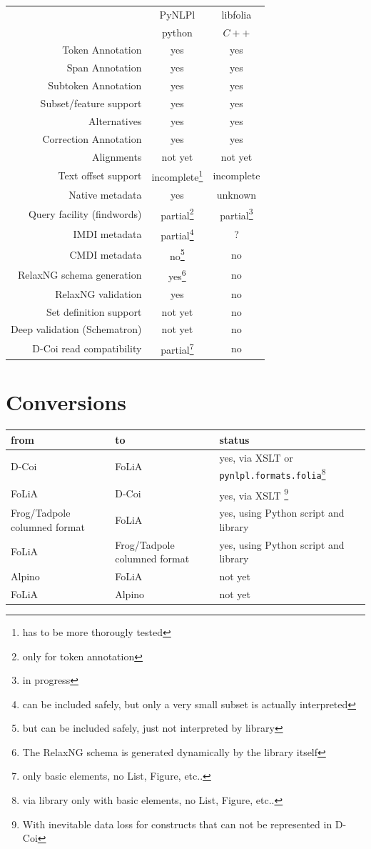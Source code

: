 \documentclass[a4paper,12pt]{report}
\begin{document}
\begin{tabular}{|r|c|c|}
\hline
                        & PyNLPl & libfolia  \\
                        & python & $C++$ \\
\hline
Token Annotation        & yes & yes \\
Span Annotation         & yes & yes \\
Subtoken Annotation     & yes & yes \\
Subset/feature support  & yes & yes \\
Alternatives            & yes & yes \\
Correction Annotation   & yes & yes \\
Alignments              & not yet & not yet \\
Text offset support     & incomplete\footnote{has to be more thorougly tested} & incomplete \\
Native metadata         & yes & unknown \\
\hline
Query facility (findwords) & partial\footnote{only for token annotation} & partial\footnote{in progress} \\
\hline
IMDI metadata           & partial\footnote{can be included safely, but only a very small subset is actually interpreted} & ? \\
CMDI metadata           & no\footnote{but can be included safely, just not interpreted by library} & no \\
RelaxNG schema generation & yes\footnote{The RelaxNG schema is generated dynamically by the library itself} & no \\
RelaxNG validation      & yes & no \\
Set definition support  & not yet & no \\
Deep validation (Schematron)  & not yet & no \\
D-Coi read compatibility      & partial\footnote{only basic elements, no List, Figure, etc..} & no \\
\hline
\end{tabular}

\chapter{Conversions}
 
\begin{tabular}{|l|l|l|}
\hline
from & to & status  \\
\hline
D-Coi & FoLiA & yes, via XSLT or \texttt{pynlpl.formats.folia}\footnote{via library only with basic elements, no List, Figure, etc..} \\
FoLiA & D-Coi & yes, via XSLT \footnote{With inevitable data loss for constructs that can not be represented in D-Coi} \\
Frog/Tadpole columned format & FoLiA & yes, using Python script and library \\
FoLiA & Frog/Tadpole columned format & yes, using Python script and library \\
Alpino & FoLiA & not yet \\
FoLiA & Alpino & not yet \\
\hline
\end{tabular} 



\end{document}
